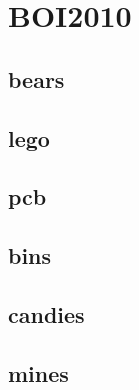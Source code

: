 \section{BOI2010}
\subsection{bears}
\subsection{lego}
\subsection{pcb}
\subsection{bins}
\subsection{candies}
\subsection{mines}
